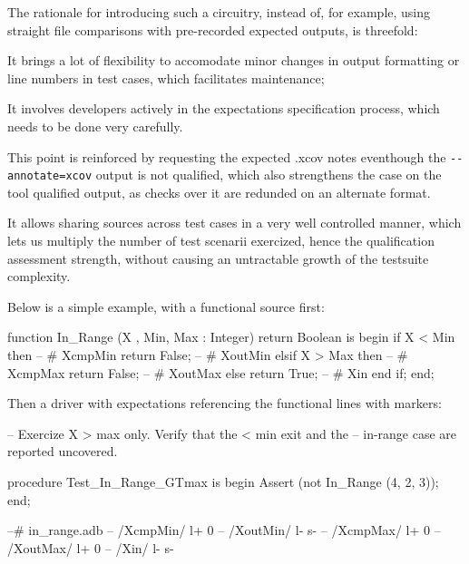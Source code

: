 \documentclass {report}
\begin{document}
The rationale for introducing such a circuitry, instead of, for example, using
straight file comparisons with pre-recorded expected outputs, is threefold:

\begin{Itemize}
\item%
  It brings a lot of flexibility to accomodate minor changes in output
  formatting or line numbers in test cases, which facilitates maintenance;
%
\item%
  It involves developers actively in the expectations specification
  process, which needs to be done very carefully.
  
  This point is reinforced by requesting the expected .xcov notes eventhough
  the \verb|--annotate=xcov| output is not qualified, which also strengthens
  the case on the tool qualified output, as checks over it are redunded
  on an alternate format. 
%
\item%
  It allows sharing sources across test cases in a very well controlled
  manner, which lets us multiply the number of test scenarii exercized, hence
  the qualification assessment strength, without causing an untractable
  growth of the testsuite complexity.

\end{Itemize}

Below is a simple example, with a functional  source
first:

\begin{Text}
      function In_Range (X , Min, Max : Integer) return Boolean is
      begin
         if X < Min then     -- # XcmpMin
            return False;    -- # XoutMin
         elsif X > Max then  -- # XcmpMax
            return False;    -- # XoutMax
         else
            return True;     -- # Xin
         end if;
      end;
\end{Text}

Then a driver with \stc{} expectations referencing the functional
lines with markers:

\begin{Text}
      --  Exercize X > max only. Verify that the < min exit and the
      --  in-range case are reported uncovered.

      procedure Test_In_Range_GTmax is
      begin
         Assert (not In_Range (4, 2, 3));
      end;

      --# in_range.adb
      --  /XcmpMin/  l+ 0
      --  /XoutMin/  l- s-
      --  /XcmpMax/  l+ 0
      --  /XoutMax/  l+ 0
      --  /Xin/      l- s-
\end{Text}
\end{document}
